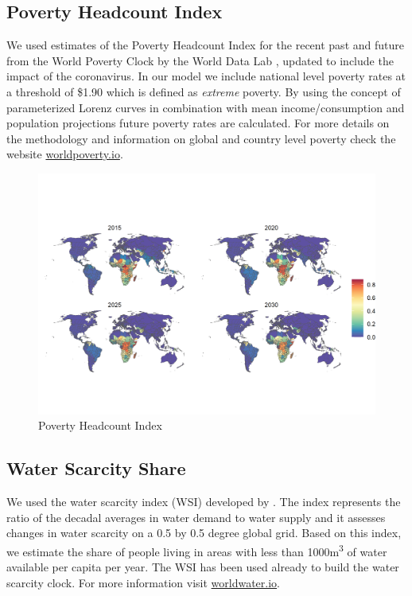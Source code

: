 \documentclass{article}
\begin{document}
\subsection{Poverty Headcount Index}
We used estimates of the Poverty Headcount Index for the recent past and future from the World Poverty Clock by the World Data Lab \citep{Cuaresma2018}, updated to include the impact of the coronavirus. In our model we include national level poverty rates at a threshold of \$1.90 which is defined as \textit{extreme} poverty. By using the concept of parameterized Lorenz curves in combination with mean income/consumption and population projections future poverty rates are calculated. For more details on the methodology and information on global and country level poverty check the website \url{worldpoverty.io}.

\begin{figure}[H]
  \centering
  \includegraphics[width=\linewidth]{img/covars/hci.png}
  \caption{Poverty Headcount Index}
\end{figure}


\subsection{Water Scarcity Share}
We used the water scarcity index (WSI) developed by \citep{greve2018global}. The index represents the ratio of the decadal averages in water demand to water supply and it assesses changes in water scarcity on a 0.5 by 0.5 degree global grid.  Based on this index, we estimate the share of people living in areas with less than 1000m\textsuperscript{3} of water available per capita per year. The WSI has been used already to build the water scarcity clock. For more information visit \href{https://worldwater.io/}{worldwater.io}.
\end{document}
